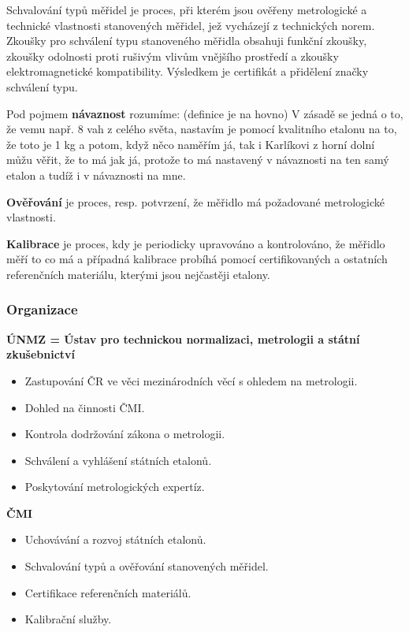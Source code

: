 Schvalování typů měřidel je proces, při kterém jsou ověřeny metrologické a technické vlastnosti stanovených měřidel, jež vycházejí z technických norem. Zkoušky pro schválení typu stanoveného měřidla obsahuji funkční zkoušky, zkoušky odolnosti proti rušivým vlivům vnějšího prostředí a zkoušky elektromagnetické kompatibility. Výsledkem je certifikát a přidělení značky schválení typu.

Pod pojmem \textbf{návaznost} rozumíme: (definice je na hovno) V zásadě se jedná o to, že vemu např. 8 vah z celého světa, nastavím je pomocí kvalitního etalonu na to, že toto je 1 kg a potom, když něco naměřím já, tak i Karlíkovi z horní dolní můžu věřit, že to má jak já, protože to má nastavený v návaznosti na ten samý etalon a tudíž i v návaznosti na mne.

\textbf{Ověřování} je proces, resp. potvrzení, že měřidlo má požadované metrologické vlastnosti.

\textbf{Kalibrace} je proces, kdy je periodicky upravováno a kontrolováno, že měřidlo měří to co má a případná kalibrace probíhá pomocí certifikovaných a ostatních referenčních materiálu, kterými jsou nejčastěji etalony.

\subsubsection{Organizace}

\textbf{ÚNMZ = Ústav pro technickou normalizaci, metrologii a státní zkušebnictví}

\begin{itemize}
    \item Zastupování ČR ve věci mezinárodních věcí s ohledem na metrologii.
    \item Dohled na činnosti ČMI.
    \item Kontrola dodržování zákona o metrologii.
    \item Schválení a vyhlášení státních etalonů.
    \item Poskytování metrologických expertíz.
\end{itemize}

\textbf{ČMI}

\begin{itemize}
    \item Uchovávání a rozvoj státních etalonů.
    \item Schvalování typů a ověřování stanovených měřidel.
    \item Certifikace referenčních materiálů.
    \item Kalibrační služby.
\end{itemize}

